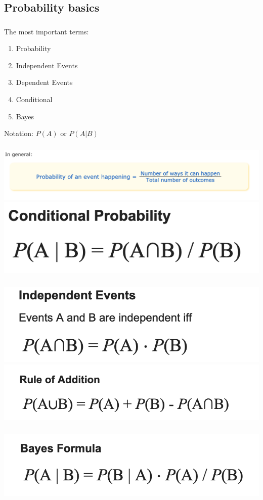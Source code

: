 \documentclass[t, 11pt]{beamer}
\begin{document}
	\subsection{Probability basics}
	\begin{frame} 
		\frametitle{\insertsection} 
		\frametitle{\insertsubsection} 
		The most important terms:
		\begin{enumerate}
			\item Probability
			\item Independent Events 
			\item Dependent Events
			\item Conditional 
			\item Bayes
		\end{enumerate}
		\vspace{1cm}
		Notation: $P(A)$ or $P(A|B)$
	\end{frame}
	
	\begin{frame} 
		\frametitle{} 
		\frametitle{} 
		\includegraphics[scale=0.4]{prob}	
		\includegraphics[scale=0.6]{cond}	
	\end{frame}	
	
	\begin{frame} 
		\frametitle{} 
		\frametitle{} 
		\includegraphics[scale=0.6]{and_prob}	
		\includegraphics[scale=0.6]{or_prob}	
	\end{frame}	
	
	\begin{frame} 
		\frametitle{} 
		\frametitle{} 
		\includegraphics[scale=0.6]{Bayes}	
	\end{frame}	
	
\end{document}
